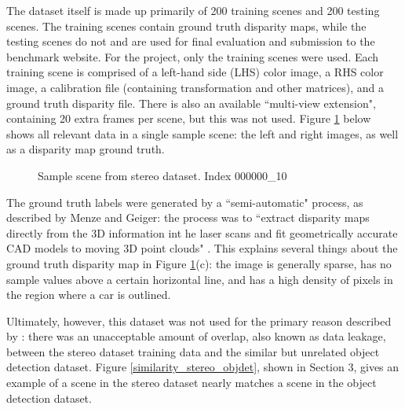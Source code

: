 The dataset itself is made up primarily of 200 training scenes and 200 testing scenes. The training scenes contain ground truth disparity maps, while the testing scenes do not and are used for final evaluation and submission to the benchmark website. For the project, only the training scenes were used. Each training scene is comprised of a left-hand side (LHS) color image, a RHS color image, a calibration file (containing transformation and other matrices), and a ground truth disparity file. There is also an available ``multi-view extension", containing 20 extra frames per scene, but this was not used. Figure \ref{stereo_sample} below shows all relevant data in a single sample scene: the left and right images, as well as a disparity map ground truth.

\begin{figure}[H]
    \centering
    \caption{Sample scene from stereo dataset. Index 000000\_10}
    \label{stereo_sample}
\end{figure}

The ground truth labels were generated by a ``semi-automatic" process, as described by Menze and Geiger: the process was to ``extract disparity maps directly from the 3D information int he laser scans and fit geometrically accurate CAD models to moving 3D point clouds" \cite{Menze_2015_CVPR}. This explains several things about the ground truth disparity map in Figure \ref{stereo_sample}(c): the image is generally sparse, has no sample values above a certain horizontal line, and has a high density of pixels in the region where a car is outlined.

Ultimately, however, this dataset was not used for the primary reason described by \cite{wang_pseudo-lidar_2019}: there was an unacceptable amount of overlap, also known as data leakage, between the stereo dataset training data and the similar but unrelated object detection dataset. Figure \ref{similarity_stereo_objdet}, shown in Section 3, gives an example of a scene in the stereo dataset nearly matches a scene in the object detection dataset.

